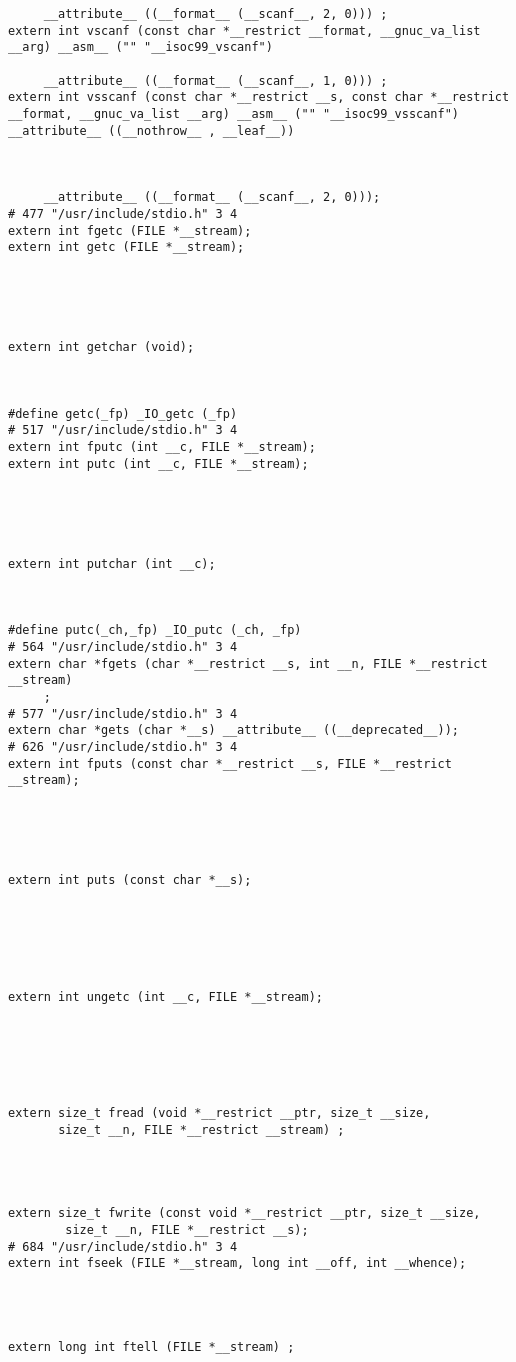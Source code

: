 \documentclass[11pt]{article}
\begin{document}
\begin{verbatim}
     __attribute__ ((__format__ (__scanf__, 2, 0))) ;
extern int vscanf (const char *__restrict __format, __gnuc_va_list __arg) __asm__ ("" "__isoc99_vscanf")

     __attribute__ ((__format__ (__scanf__, 1, 0))) ;
extern int vsscanf (const char *__restrict __s, const char *__restrict __format, __gnuc_va_list __arg) __asm__ ("" "__isoc99_vsscanf") __attribute__ ((__nothrow__ , __leaf__))



     __attribute__ ((__format__ (__scanf__, 2, 0)));
# 477 "/usr/include/stdio.h" 3 4
extern int fgetc (FILE *__stream);
extern int getc (FILE *__stream);





extern int getchar (void);



#define getc(_fp) _IO_getc (_fp)
# 517 "/usr/include/stdio.h" 3 4
extern int fputc (int __c, FILE *__stream);
extern int putc (int __c, FILE *__stream);





extern int putchar (int __c);



#define putc(_ch,_fp) _IO_putc (_ch, _fp)
# 564 "/usr/include/stdio.h" 3 4
extern char *fgets (char *__restrict __s, int __n, FILE *__restrict __stream)
     ;
# 577 "/usr/include/stdio.h" 3 4
extern char *gets (char *__s) __attribute__ ((__deprecated__));
# 626 "/usr/include/stdio.h" 3 4
extern int fputs (const char *__restrict __s, FILE *__restrict __stream);





extern int puts (const char *__s);






extern int ungetc (int __c, FILE *__stream);






extern size_t fread (void *__restrict __ptr, size_t __size,
       size_t __n, FILE *__restrict __stream) ;




extern size_t fwrite (const void *__restrict __ptr, size_t __size,
        size_t __n, FILE *__restrict __s);
# 684 "/usr/include/stdio.h" 3 4
extern int fseek (FILE *__stream, long int __off, int __whence);




extern long int ftell (FILE *__stream) ;





\end{verbatim}
\end{document}
